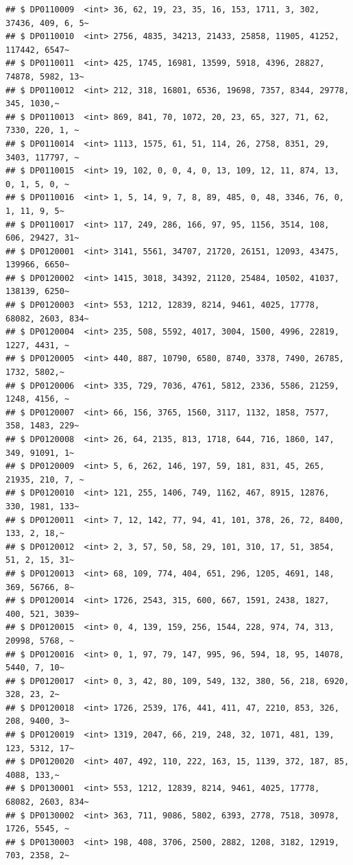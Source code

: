 \documentclass[]{article}
\begin{document}
\begin{verbatim}
## $ DP0110009  <int> 36, 62, 19, 23, 35, 16, 153, 1711, 3, 302, 37436, 409, 6, 5~
## $ DP0110010  <int> 2756, 4835, 34213, 21433, 25858, 11905, 41252, 117442, 6547~
## $ DP0110011  <int> 425, 1745, 16981, 13599, 5918, 4396, 28827, 74878, 5982, 13~
## $ DP0110012  <int> 212, 318, 16801, 6536, 19698, 7357, 8344, 29778, 345, 1030,~
## $ DP0110013  <int> 869, 841, 70, 1072, 20, 23, 65, 327, 71, 62, 7330, 220, 1, ~
## $ DP0110014  <int> 1113, 1575, 61, 51, 114, 26, 2758, 8351, 29, 3403, 117797, ~
## $ DP0110015  <int> 19, 102, 0, 0, 4, 0, 13, 109, 12, 11, 874, 13, 0, 1, 5, 0, ~
## $ DP0110016  <int> 1, 5, 14, 9, 7, 8, 89, 485, 0, 48, 3346, 76, 0, 1, 11, 9, 5~
## $ DP0110017  <int> 117, 249, 286, 166, 97, 95, 1156, 3514, 108, 606, 29427, 31~
## $ DP0120001  <int> 3141, 5561, 34707, 21720, 26151, 12093, 43475, 139966, 6650~
## $ DP0120002  <int> 1415, 3018, 34392, 21120, 25484, 10502, 41037, 138139, 6250~
## $ DP0120003  <int> 553, 1212, 12839, 8214, 9461, 4025, 17778, 68082, 2603, 834~
## $ DP0120004  <int> 235, 508, 5592, 4017, 3004, 1500, 4996, 22819, 1227, 4431, ~
## $ DP0120005  <int> 440, 887, 10790, 6580, 8740, 3378, 7490, 26785, 1732, 5802,~
## $ DP0120006  <int> 335, 729, 7036, 4761, 5812, 2336, 5586, 21259, 1248, 4156, ~
## $ DP0120007  <int> 66, 156, 3765, 1560, 3117, 1132, 1858, 7577, 358, 1483, 229~
## $ DP0120008  <int> 26, 64, 2135, 813, 1718, 644, 716, 1860, 147, 349, 91091, 1~
## $ DP0120009  <int> 5, 6, 262, 146, 197, 59, 181, 831, 45, 265, 21935, 210, 7, ~
## $ DP0120010  <int> 121, 255, 1406, 749, 1162, 467, 8915, 12876, 330, 1981, 133~
## $ DP0120011  <int> 7, 12, 142, 77, 94, 41, 101, 378, 26, 72, 8400, 133, 2, 18,~
## $ DP0120012  <int> 2, 3, 57, 50, 58, 29, 101, 310, 17, 51, 3854, 51, 2, 15, 31~
## $ DP0120013  <int> 68, 109, 774, 404, 651, 296, 1205, 4691, 148, 369, 56766, 8~
## $ DP0120014  <int> 1726, 2543, 315, 600, 667, 1591, 2438, 1827, 400, 521, 3039~
## $ DP0120015  <int> 0, 4, 139, 159, 256, 1544, 228, 974, 74, 313, 20998, 5768, ~
## $ DP0120016  <int> 0, 1, 97, 79, 147, 995, 96, 594, 18, 95, 14078, 5440, 7, 10~
## $ DP0120017  <int> 0, 3, 42, 80, 109, 549, 132, 380, 56, 218, 6920, 328, 23, 2~
## $ DP0120018  <int> 1726, 2539, 176, 441, 411, 47, 2210, 853, 326, 208, 9400, 3~
## $ DP0120019  <int> 1319, 2047, 66, 219, 248, 32, 1071, 481, 139, 123, 5312, 17~
## $ DP0120020  <int> 407, 492, 110, 222, 163, 15, 1139, 372, 187, 85, 4088, 133,~
## $ DP0130001  <int> 553, 1212, 12839, 8214, 9461, 4025, 17778, 68082, 2603, 834~
## $ DP0130002  <int> 363, 711, 9086, 5802, 6393, 2778, 7518, 30978, 1726, 5545, ~
## $ DP0130003  <int> 198, 408, 3706, 2500, 2882, 1208, 3182, 12919, 703, 2358, 2~

\end{verbatim}
\end{document}
